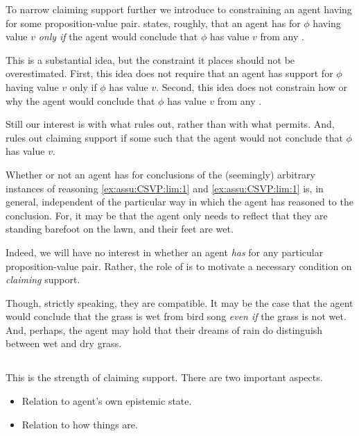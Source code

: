 \begin{note}[Support]
  To narrow claiming support further we introduce \ideaCSA{} to constraining an agent having \support{} for some proposition-value pair.
  \ideaCSA{} states, roughly, that an agent has \support{} for \(\phi\) having value \(v\) \emph{only if} the agent would conclude that \(\phi\) has value \(v\) from any .

  This is a substantial idea, but the constraint it places should not be overestimated.
  First, this idea does not require that an agent has support for \(\phi\) having value \(v\) only if \(\phi\) has value \(v\).
  Second, this idea does not constrain how or why the agent would conclude that \(\phi\) has value \(v\) from any .

  Still our interest is with what \ideaCSA{} rules out, rather than with what \ideaCSA{} permits.
  And, \ideaCSA{} rules out claiming support if some \epPW{} such that the agent would not conclude that \(\phi\) has value \(v\).

  Whether or not an agent has \support{} for conclusions of the (seemingly) arbitrary instances of reasoning \ref{ex:assu:CSVP:lim:1} and \ref{ex:assu:CSVP:lim:1} is, in general, independent of the particular way in which the agent has reasoned to the conclusion.
  For, it may be that the agent only needs to reflect that they are standing barefoot on the lawn, and their feet are wet.
\end{note}

\begin{note}
  Indeed, we will have no interest in whether an agent \emph{has}  for any particular proposition-value pair.
  Rather, the role of \ideaCSA{} is to motivate a necessary condition on \emph{claiming} support.

  \hozline

  Though, strictly speaking, they are compatible.
  It may be the case that the agent would conclude that the grass is wet from bird song \emph{even if} the grass is not wet.
  And, perhaps, the agent may hold that their dreams of rain do distinguish between wet and dry grass.
\end{note}

\subsection{}
\label{sec:ideaCSB}

\begin{note}
  \color{red}
  This is the strength of claiming support.
  There are two important aspects.
  \begin{itemize}
  \item Relation to agent's own epistemic state.
  \item Relation to how things are.
  \end{itemize}
\end{note}

